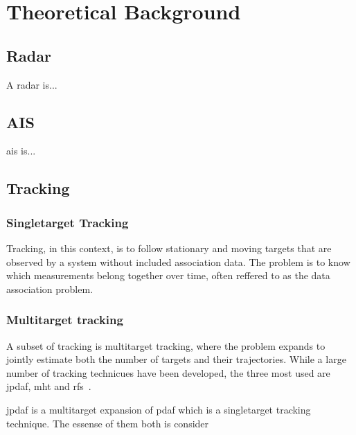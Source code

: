 
\chapter{Theoretical Background}\label{chapter:theoretical_background}
\section{Radar}
A radar is...

\section{AIS}
\gls{ais} is...

\section{Tracking}

\subsection{Singletarget Tracking}
Tracking, in this context, is to follow stationary and moving targets that are observed by a system without included association data. The problem is to know which measurements belong together over time, often reffered to as the data association problem.

\subsection{Multitarget tracking}
A subset of tracking is multitarget tracking, where the problem expands to jointly estimate both the number of targets and their trajectories. While a large number of tracking technicues have been developed, the three most used are \gls{jpdaf}, \gls{mht} and \gls{rfs}~\cite{Vo2015}.

\gls{jpdaf} is a multitarget expansion of \gls{pdaf} which is a singletarget tracking technique. The essense of them both is consider 



